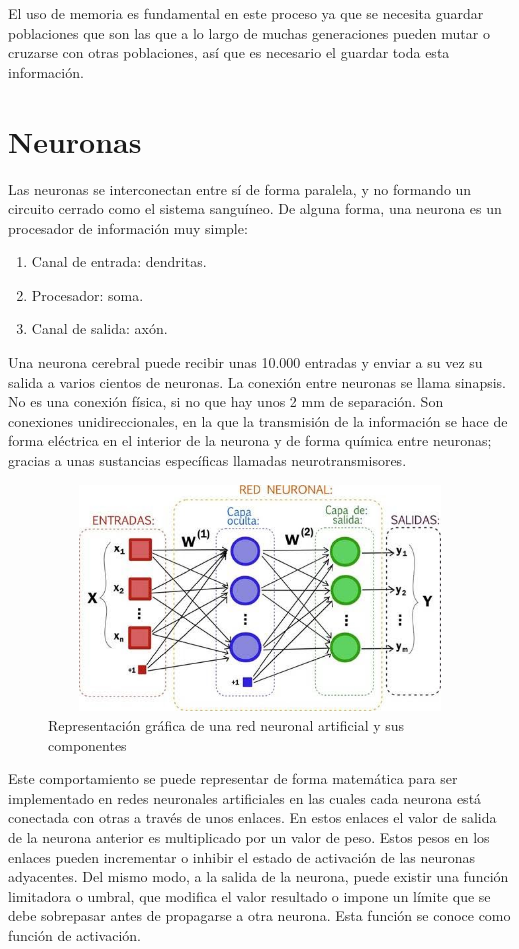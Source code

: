 \documentclass[12pt, titlepage]{article}
\begin{document}
El uso de memoria es fundamental en este proceso ya que se necesita guardar poblaciones que son las que a lo largo de muchas generaciones pueden mutar o cruzarse con otras poblaciones, así que es necesario el guardar toda esta información.
\section{Neuronas}
Las neuronas se interconectan entre sí de forma paralela, y no formando un circuito cerrado como el sistema sanguíneo. De alguna forma, una neurona es un procesador de información muy simple:

\begin{enumerate}
    \item Canal de entrada: dendritas.
    \item Procesador: soma.
    \item Canal de salida: axón.
\end{enumerate}

Una neurona cerebral puede recibir unas 10.000 entradas y enviar a su vez su salida a varios cientos de neuronas. La conexión entre neuronas se llama sinapsis. No es una conexión física, si no que hay unos 2 mm de separación. Son conexiones unidireccionales, en la que la transmisión de la información se hace de forma eléctrica en el interior de la neurona y de forma química entre neuronas; gracias a unas sustancias específicas llamadas neurotransmisores.

\begin{figure}[H]
    \begin{center}
        \includegraphics[width=12cm, height=6cm]{./img/red.jpg}
        \caption{Representación gráfica de una red neuronal artificial y sus componentes}
        \label{fig:red}
    \end{center}
\end{figure}

Este comportamiento se puede representar de forma matemática para ser implementado en redes neuronales artificiales en las cuales cada neurona está conectada con otras a través de unos enlaces. En estos enlaces el valor de salida de la neurona anterior es multiplicado por un valor de peso. Estos pesos en los enlaces pueden incrementar o inhibir el estado de activación de las neuronas adyacentes. Del mismo modo, a la salida de la neurona, puede existir una función limitadora o umbral, que modifica el valor resultado o impone un límite que se debe sobrepasar antes de propagarse a otra neurona. Esta función se conoce como función de activación.
\end{document}
